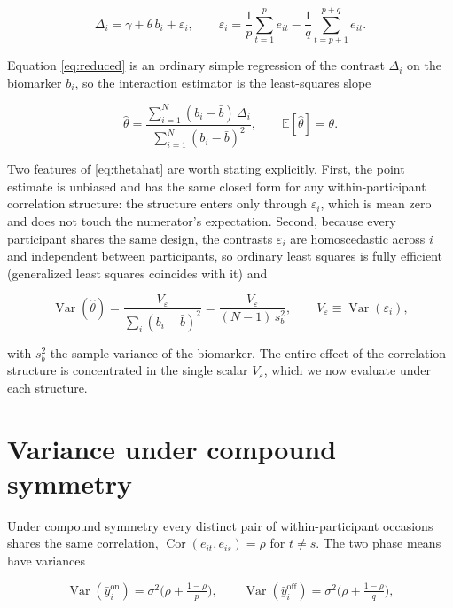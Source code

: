 \documentclass[
  11pt,
]{article}
\begin{document}
\begin{equation}
\Delta_i = \gamma + \theta\, b_i + \varepsilon_i,
\qquad
\varepsilon_i = \frac{1}{p}\sum_{t=1}^{p} e_{it}
              - \frac{1}{q}\sum_{t=p+1}^{p+q} e_{it}.
\label{eq:reduced}
\end{equation}

Equation \eqref{eq:reduced} is an ordinary simple regression of the
contrast \(\Delta_i\) on the biomarker \(b_i\), so the interaction
estimator is the least-squares slope

\begin{equation}
\hat\theta
  = \frac{\sum_{i=1}^{N} (b_i - \bar b)\,\Delta_i}
         {\sum_{i=1}^{N} (b_i - \bar b)^2},
\qquad
\mathbb{E}[\hat\theta] = \theta .
\label{eq:thetahat}
\end{equation}

Two features of \eqref{eq:thetahat} are worth stating explicitly.
First, the point estimate is unbiased and has the same closed form
for any within-participant correlation structure: the structure
enters only through \(\varepsilon_i\), which is mean zero and does not
touch the numerator's expectation. Second, because every participant
shares the same design, the contrasts \(\varepsilon_i\) are
homoscedastic across \(i\) and independent between participants, so
ordinary least squares is fully efficient (generalized least squares
coincides with it) and

\begin{equation}
\operatorname{Var}(\hat\theta)
  = \frac{V_\varepsilon}{\sum_i (b_i - \bar b)^2}
  = \frac{V_\varepsilon}{(N-1)\, s_b^2},
\qquad
V_\varepsilon \equiv \operatorname{Var}(\varepsilon_i),
\label{eq:vartheta}
\end{equation}

with \(s_b^2\) the sample variance of the biomarker. The entire effect
of the correlation structure is concentrated in the single scalar
\(V_\varepsilon\), which we now evaluate under each structure.

\section{Variance under compound symmetry}\label{variance-under-compound-symmetry}

Under compound symmetry every distinct pair of within-participant
occasions shares the same correlation, \(\operatorname{Cor}(e_{it},
e_{is}) = \rho\) for \(t \neq s\). The two phase means have variances

\begin{equation}
\operatorname{Var}(\bar y_i^{\text{on}})
  = \sigma^2\Big(\rho + \tfrac{1-\rho}{p}\Big),
\qquad
\operatorname{Var}(\bar y_i^{\text{off}})
  = \sigma^2\Big(\rho + \tfrac{1-\rho}{q}\Big),
\label{eq:cs-means}
\end{equation}
\end{document}
